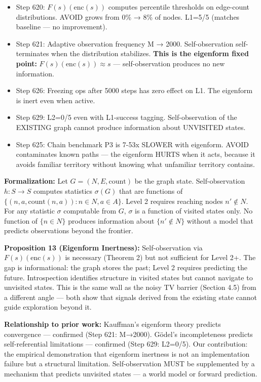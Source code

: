 \documentclass[
  11pt,
]{article}
\providecommand{\tightlist}{%
  \setlength{\itemsep}{0pt}\setlength{\parskip}{0pt}}
\begin{document}
\begin{itemize}
\tightlist
\item
  Step 620: \(F(s)(\text{enc}(s))\) computes percentile thresholds on
  edge-count distributions. AVOID grows from 0\% → 8\% of nodes. L1=5/5
  (matches baseline --- no improvement).
\item
  Step 621: Adaptive observation frequency M → 2000. Self-observation
  self-terminates when the distribution stabilizes. \textbf{This is the
  eigenform fixed point:} \(F(s)(\text{enc}(s)) \approx s\) ---
  self-observation produces no new information.
\item
  Step 626: Freezing ops after 5000 steps has zero effect on L1. The
  eigenform is inert even when active.
\item
  Step 629: L2=0/5 even with L1-success tagging. Self-observation of the
  EXISTING graph cannot produce information about UNVISITED states.
\item
  Step 625: Chain benchmark P3 is 7-53x SLOWER with eigenform. AVOID
  contaminates known paths --- the eigenform HURTS when it acts, because
  it avoids familiar territory without knowing what unfamiliar territory
  contains.
\end{itemize}

\textbf{Formalization:} Let \(G = (N, E, \text{count})\) be the graph
state. Self-observation \(h: S \to S\) computes statistics \(\sigma(G)\)
that are functions of
\(\{(n, a, \text{count}(n,a)) : n \in N, a \in A\}\). Level 2 requires
reaching nodes \(n' \notin N\). For any statistic \(\sigma\) computable
from \(G\), \(\sigma\) is a function of visited states only. No function
of \(\{n \in N\}\) produces information about \(\{n' \notin N\}\)
without a model that predicts observations beyond the frontier.

\textbf{Proposition 13 (Eigenform Inertness):} Self-observation via
\(F(s)(\text{enc}(s))\) is necessary (Theorem 2) but not sufficient for
Level 2+. The gap is informational: the graph stores the past; Level 2
requires predicting the future. Introspection identifies structure in
visited states but cannot navigate to unvisited states. This is the same
wall as the noisy TV barrier (Section 4.5) from a different angle ---
both show that signals derived from the existing state cannot guide
exploration beyond it.

\textbf{Relationship to prior work:} Kauffman's eigenform theory
predicts convergence --- confirmed (Step 621: M→2000). Gödel's
incompleteness predicts self-referential limitations --- confirmed (Step
629: L2=0/5). Our contribution: the empirical demonstration that
eigenform inertness is not an implementation failure but a structural
limitation. Self-observation MUST be supplemented by a mechanism that
predicts unvisited states --- a world model or forward prediction.
\end{document}
